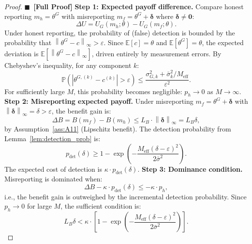 \documentclass[11pt,a4paper]{article}
\theoremstyle{definition}
\newcommand{\rigorFull}[0]{$\blacksquare$~\textbf{[Full Proof]}}
\newcommand{\E}{\mathbb{E}}
\newcommand{\Pbb}{\mathbb{P}}
\newcommand{\norm}[1]{\left\lVert#1\right\rVert}
\newcommand{\abs}[1]{\left|#1\right|}
\begin{document}
\begin{proof}\rigorFull
\textbf{Step 1: Expected payoff difference.} Compare honest reporting $m_h = \theta^G$ with misreporting $m_f = \theta^G + \bm{\delta}$ where $\bm{\delta} \neq \mathbf{0}$:
\begin{equation}
    \Delta U = U_G(m_h; \theta) - U_G(m_f; \theta).
    \label{eq:delta_U}
\end{equation}
Under honest reporting, the probability of (false) detection is bounded by the probability that $\norm{\theta^G - c}_\infty > \varepsilon$. Since $\E[c] = \theta$ and $\E[\theta^G] = \theta$, the expected deviation is $\E[\norm{\theta^G - c}_\infty]$, driven entirely by measurement errors. By Chebyshev's inequality, for any component $k$:
\begin{equation}
    \Pbb(\abs{\theta^{G,(k)} - c^{(k)}} > \varepsilon) \leq \frac{\sigma_{G,k}^2 + \bar{\sigma}_k^2/M_{\mathrm{eff}}}{\varepsilon^2}.
    \label{eq:honest_detection}
\end{equation}
For sufficiently large $M$, this probability becomes negligible: $p_h \to 0$ as $M \to \infty$.
\textbf{Step 2: Misreporting expected payoff.} Under misreporting $m_f = \theta^G + \bm{\delta}$ with $\norm{\bm{\delta}}_\infty = \delta > \varepsilon$, the benefit gain is:
\begin{equation}
    \Delta B = B(m_f) - B(m_h) \leq L_B \cdot \norm{\bm{\delta}}_\infty = L_B \delta,
    \label{eq:benefit_gain}
\end{equation}
by Assumption~\ref{ass:A11} (Lipschitz benefit).
The detection probability from Lemma~\ref{lem:detection_prob} is:
\begin{equation}
    p_{\mathrm{det}}(\delta) \geq 1 - \exp\left(-\frac{M_{\mathrm{eff}} (\delta - \varepsilon)^2}{2\bar{\sigma}^2}\right).
    \label{eq:p_det_misreport}
\end{equation}
The expected cost of detection is $\kappa \cdot p_{\mathrm{det}}(\delta)$.
\textbf{Step 3: Dominance condition.} Misreporting is dominated when:
\begin{equation}
    \Delta B - \kappa \cdot p_{\mathrm{det}}(\delta) \leq - \kappa \cdot p_h,
    \label{eq:dominance_condition}
\end{equation}
i.e., the benefit gain is outweighed by the incremental detection probability. Since $p_h \to 0$ for large $M$, the sufficient condition is:
\begin{equation}
    L_B \delta < \kappa \cdot \left[1 - \exp\left(-\frac{M_{\mathrm{eff}} (\delta - \varepsilon)^2}{2\bar{\sigma}^2}\right)\right].

\end{equation}
\end{proof}
\end{document}
